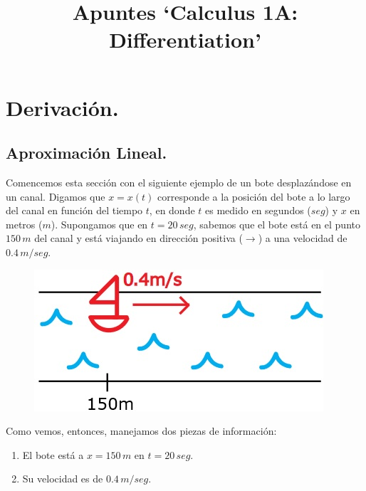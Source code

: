 \documentclass[12pt]{article}
\begin{document}
\title{Apuntes `Calculus 1A: Differentiation'}
\author{}
\date{}
\maketitle

\tableofcontents

\newpage



\section{Derivación.}

\subsection{Aproximación Lineal.}

Comencemos esta sección con el siguiente ejemplo de un bote desplazándose en un canal. Digamos que $x = x(t)$ corresponde a la posición del bote a lo largo del canal en función del tiempo $t$, en donde $t$ es medido en segundos ($seg$) y $x$ en metros ($m$). Supongamos que en $t = 20 \, seg$, sabemos que el bote está en el punto $150 \, m$ del canal y está viajando en dirección positiva ($\rightarrow$) a una velocidad de $0.4 \, m/seg$.

\begin{figure}[hbt!]
\centering
\includegraphics[scale=0.7]{img/approx_lin_examp.jpg}
\end{figure}

Como vemos, entonces, manejamos dos piezas de información:

\begin{enumerate}
\item El bote está a $x = 150 \,m$ en $t = 20 \, seg$.
\item Su velocidad es de $0.4 \, m/seg$.
\end{enumerate}
\end{document}
